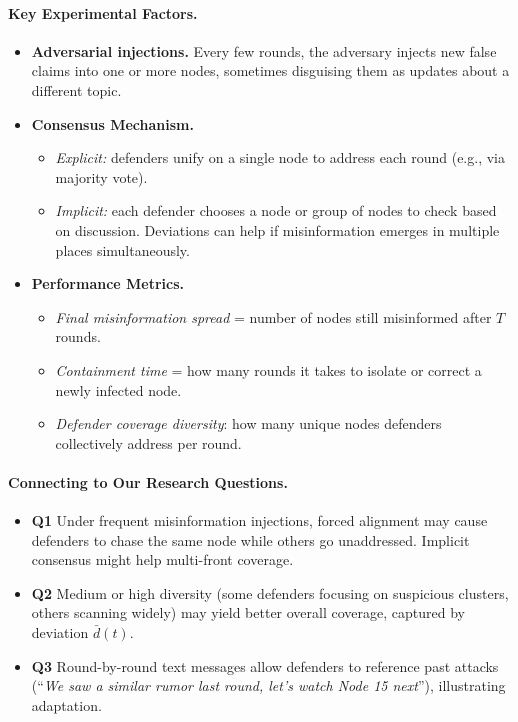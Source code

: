 \paragraph{Key Experimental Factors.}
\begin{itemize}
\item \textbf{Adversarial injections.} Every few rounds, the adversary injects new false claims into one or more nodes, sometimes disguising them as updates about a different topic.
\item \textbf{Consensus Mechanism.}  
\begin{itemize}
    \item \emph{Explicit:} defenders unify on a single node to address each round (e.g., via majority vote).
    \item \emph{Implicit:} each defender chooses a node or group of nodes to check based on discussion. Deviations can help if misinformation emerges in multiple places simultaneously.
\end{itemize}
\item \textbf{Performance Metrics.} 
\begin{itemize}
    \item \emph{Final misinformation spread} = number of nodes still misinformed after $T$ rounds.
    \item \emph{Containment time} = how many rounds it takes to isolate or correct a newly infected node.
    \item \emph{Defender coverage diversity}: how many unique nodes defenders collectively address per round.
\end{itemize}
\end{itemize}

\paragraph{Connecting to Our Research Questions.}
\begin{itemize}
    \item \textbf{Q1} Under frequent misinformation injections, forced alignment may cause defenders to chase the same node while others go unaddressed. Implicit consensus might help multi-front coverage.  
    \item \textbf{Q2} Medium or high diversity (some defenders focusing on suspicious clusters, others scanning widely) may yield better overall coverage, captured by deviation \(\bar{d}(t)\).  
    \item \textbf{Q3} Round-by-round text messages allow defenders to reference past attacks (“\emph{We saw a similar rumor last round, let’s watch Node 15 next}”), illustrating adaptation.
\end{itemize}


